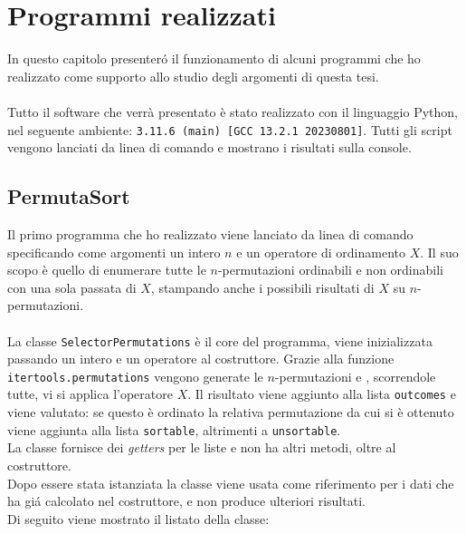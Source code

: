 \chapter{Programmi realizzati}
In questo capitolo presenter\'o il funzionamento di alcuni programmi che ho realizzato come supporto allo studio degli argomenti di questa tesi.\\\\
Tutto il software che verr\`a presentato \`e stato realizzato con il linguaggio Python, nel seguente ambiente: \texttt{3.11.6 (main) [GCC 13.2.1 20230801]}. Tutti gli script vengono lanciati da linea di comando e mostrano i risultati sulla console.
\section{PermutaSort}
Il primo programma che ho realizzato viene lanciato da linea di comando specificando come argomenti un intero $n$ e un operatore di ordinamento $X$. Il suo scopo \`e quello di enumerare tutte le $n$-permutazioni ordinabili e non ordinabili con una sola passata di $X$, stampando anche i possibili risultati di $X$ su $n$-permutazioni.\\\\
La classe \texttt{SelectorPermutations} \`e il core del programma, viene inizializzata passando un intero e un operatore al costruttore. Grazie alla funzione \texttt{itertools.permutations} vengono generate le $n$-permutazioni e , scorrendole tutte, vi si applica l'operatore $X$. Il risultato viene aggiunto alla lista \texttt{outcomes} e viene valutato: se questo \`e ordinato la relativa permutazione da cui si \`e ottenuto viene aggiunta alla lista \texttt{sortable}, altrimenti a \texttt{unsortable}.\\La classe fornisce dei \textit{getters} per le liste e non ha altri metodi, oltre al costruttore.\\
Dopo essere stata istanziata la classe viene usata come riferimento per i dati che ha gi\'a calcolato nel costruttore, e non produce ulteriori risultati.\\Di seguito viene mostrato il listato della classe:
\\
